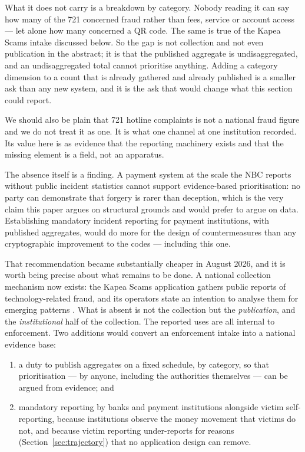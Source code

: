 \documentclass[10pt,a4paper,twocolumn]{article}
\begin{document}
What it does not carry is a breakdown by category. Nobody reading it can say how
many of the 721 concerned fraud rather than fees, service or account access ---
let alone how many concerned a QR code. The same is true of the Kapea Scams
intake discussed below. So the gap is not collection and not even publication in
the abstract; it is that the published aggregate is undisaggregated, and an
undisaggregated total cannot prioritise anything. Adding a category dimension to
a count that is already gathered and already published is a smaller ask than any
new system, and it is the ask that would change what this section could report.

We should also be plain that 721 hotline complaints is not a national fraud
figure and we do not treat it as one. It is what one channel at one institution
recorded. Its value here is as evidence that the reporting machinery exists and
that the missing element is a field, not an apparatus.

The absence itself is a finding. A payment system at the scale the NBC reports
\citep{nbc2025annual} without public incident statistics cannot support
evidence-based prioritisation: no party can demonstrate that forgery is rarer
than deception, which is the very claim this paper argues on structural grounds
and would prefer to argue on data. Establishing mandatory incident reporting for
payment institutions, with published aggregates, would do more for the design of
countermeasures than any cryptographic improvement to the codes --- including
this one.

That recommendation became substantially cheaper in August 2026, and it is worth
being precise about what remains to be done. A national collection mechanism now
exists: the Kapea Scams application gathers public reports of technology-related
fraud, and its operators state an intention to analyse them for emerging
patterns \citep{khmertimes2026kapea}. What is absent is not the collection but
the \emph{publication}, and the \emph{institutional} half of the collection. The
reported uses are all internal to enforcement. Two additions would convert an
enforcement intake into a national evidence base:

\begin{enumerate}[leftmargin=1.6em]
  \item a duty to publish aggregates on a fixed schedule, by category, so that
    prioritisation --- by anyone, including the authorities themselves --- can be
    argued from evidence; and
  \item mandatory reporting by banks and payment institutions alongside victim
    self-reporting, because institutions observe the money movement that victims
    do not, and because victim reporting under-reports for reasons
    (Section~\ref{sec:trajectory}) that no application design can remove.
\end{enumerate}
\end{document}
